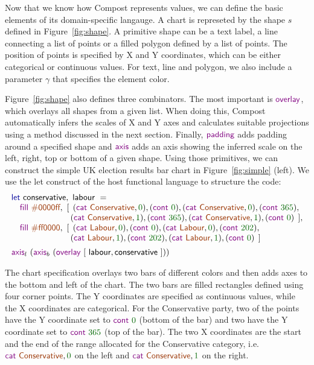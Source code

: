 \documentclass{jfp}
\newcommand{\num}[1]{\textcolor{numclr}{#1}}
\newcommand{\strf}[1]{\textnormal{\textcolor{strclr}{\sffamily #1}}}
\newcommand{\ident}[1]{\textnormal{\textcolor{idclr}{\sffamily #1}}}
\newcommand{\kvd}[1]{\textnormal{\textcolor{kvdclr}{\sffamily #1}}}
\newcommand{\fkvd}[1]{\textnormal{\textcolor{fkvdclr}{\sffamily #1}}}
\begin{document}
Now that we know how Compost represents values, we can define the basic elements of its
domain-specific langauge. A chart is represeted by the shape $s$ defined in Figure~\ref{fig:shape}.
A primitive shape can be a text label, a line connecting a list of points or a filled polygon
defined by a list of points. The position of points is specified by X and Y coordinates,
which can be either categorical or continuous values. For text, line and polygon, we also include
a parameter $\gamma$ that specifies the element color.

Figure~\ref{fig:shape} also defines three combinators. The most important is $\kvd{overlay}$,
which overlays all shapes from a given list. When doing this, Compost automatically infers the
scales of X and Y axes and calculates suitable projections using a method discussed in the next
section. Finally, $\kvd{padding}$ adds padding around a specified shape and $\kvd{axis}$ adds
an axis showing the inferred scale on the left, right, top or bottom of a given shape.
Using those primitives, we can construct the simple UK election results bar chart in Figure~\ref{fig:simple} (left).
We use the \fkvd{let} construct of the host functional language to structure the code:
%
\begin{equation*}
\begin{array}{l}
\fkvd{let}~\ident{conservative},~\ident{labour}~=\\
\quad \kvd{fill}~\strf{\#0000ff},
 ~[\;\,(\kvd{cat}~\strf{Conservative}, \num{0}), (\kvd{cont}~\num{0}), (\kvd{cat}~\strf{Conservative}, \num{0}), (\kvd{cont}~\num{365}),\\
\hspace{6.7em}\;(\kvd{cat}~\strf{Conservative}, \num{1}), (\kvd{cont}~\num{365}), (\kvd{cat}~\strf{Conservative}, \num{1}), (\kvd{cont}~\num{0})\;\,],\\
\quad \kvd{fill}~\strf{\#ff0000},
 ~[\;\,(\kvd{cat}~\strf{Labour}, \num{0}), (\kvd{cont}~\num{0}), (\kvd{cat}~\strf{Labour}, \num{0}), (\kvd{cont}~\num{202}),\\
\hspace{6.7em}\;(\kvd{cat}~\strf{Labour}, \num{1}), (\kvd{cont}~\num{202}), (\kvd{cat}~\strf{Labour}, \num{1}), (\kvd{cont}~\num{0})\,\;]\\[0.5em]
\kvd{axis}_l~(\kvd{axis}_b~(\kvd{overlay}~[~\ident{labour}, \ident{conservative}~]))\\
\end{array}
\end{equation*}

\noindent
The chart specification overlays two bars of different colors and then adds axes to the bottom and
left of the chart. The two bars are filled rectangles defined using four corner points. The Y
coordinates are specified as continuous values, while the X coordinates are categorical. For
the Conservative party, two of the points have the Y coordinate set to $\kvd{cont}~\num{0}$ (bottom of the bar)
and two have the Y coordinate set to $\kvd{cont}~\num{365}$ (top of the bar). The two X coordinates
are the start and the end of the range allocated for the \strf{Conservative} category,
i.e.~$\kvd{cat}~\strf{Conservative}, \num{0}$ on the left and $\kvd{cat}~\strf{Conservative}, \num{1}$
on the right.
\end{document}
